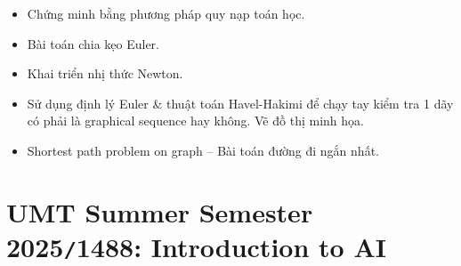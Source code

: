 \documentclass{article}
\begin{document}
\begin{itemize}
	\item Chứng minh bằng phương pháp quy nạp toán học.
	\item Bài toán chia kẹo Euler.
	\item Khai triển nhị thức Newton.
	\item Sử dụng định lý Euler \& thuật toán Havel-Hakimi để chạy tay kiểm tra 1 dãy có phải là graphical sequence hay không. Vẽ đồ thị minh họa.
	\item Shortest path problem on graph -- Bài toán đường đi ngắn nhất.
\end{itemize}


\section{UMT Summer Semester 2025{\tt/}1488: Introduction to AI}
\end{document}

